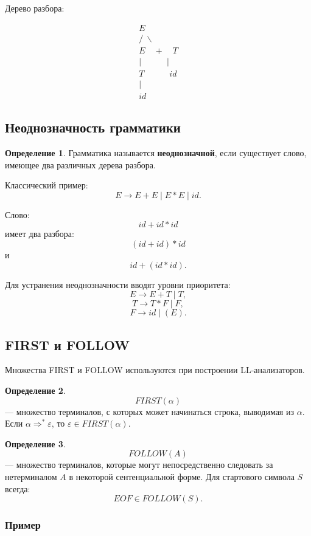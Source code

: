 \documentclass[12pt,a4paper]{article}
\theoremstyle{definition}
\newtheorem{definition}{Определение}
\theoremstyle{plain}
\begin{document}
Дерево разбора:

\[
\begin{array}{c}
E\\
/\ \backslash\\
E\quad +\quad T\\
|\quad\quad\quad |\\
T\quad\quad\quad id\\
|\\
id
\end{array}
\]

\subsection{Неоднозначность грамматики}

\begin{definition}
Грамматика называется \textbf{неоднозначной}, если существует слово, имеющее два различных дерева разбора.
\end{definition}

Классический пример:
\[
E \to E+E \mid E*E \mid id.
\]

Слово:
\[
id+id*id
\]
имеет два разбора:
\[
(id+id)*id
\]
и
\[
id+(id*id).
\]

Для устранения неоднозначности вводят уровни приоритета:
\[
E \to E+T \mid T,
\]
\[
T \to T*F \mid F,
\]
\[
F \to id \mid (E).
\]

\subsection{FIRST и FOLLOW}

Множества FIRST и FOLLOW используются при построении LL-анализаторов.

\begin{definition}
\[
FIRST(\alpha)
\]
--- множество терминалов, с которых может начинаться строка, выводимая из $\alpha$.
Если $\alpha\Rightarrow^*\varepsilon$, то $\varepsilon\in FIRST(\alpha)$.
\end{definition}

\begin{definition}
\[
FOLLOW(A)
\]
--- множество терминалов, которые могут непосредственно следовать за нетерминалом $A$ в некоторой сентенциальной форме.
Для стартового символа $S$ всегда:
\[
EOF\in FOLLOW(S).
\]
\end{definition}

\subsubsection*{Пример}
\end{document}
